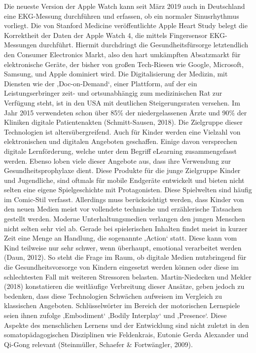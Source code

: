 \documentclass[
  a4paper,
  DIV=11,
  numbers=noendperiod,
  onecolumn,
  oneside,
  a4paper]{scrartcl}
\begin{document}
Die neueste Version der Apple Watch kann seit März 2019 auch in
Deutschland eine EKG-Messung durchführen und erfassen, ob ein normaler
Sinusrhythmus vorliegt. Die von Stanford Medicine veröffentlichte Apple
Heart Study belegt die Korrektheit der Daten der Apple Watch 4, die
mittels Fingersensor EKG-Messungen durchführt. Hiermit durchdringt die
Gesundheitsfürsorge letztendlich den Consumer Electronics Markt, also
den hart umkämpften Absatzmarkt für elektronische Geräte, der bisher von
großen Tech-Riesen wie Google, Microsoft, Samsung, und Apple dominiert
wird. Die Digitalisierung der Medizin, mit Diensten wie der
‚Doc-on-Demand`, einer Plattform, auf der ein Leistungserbringer zeit-
und ortsunabhängig zum medizinischen Rat zur Verfügung steht, ist in den
USA mit deutlichen Steigerungsraten versehen. Im Jahr 2015 verwendeten
schon über 85\% der niedergelassenen Ärzte und 90\% der Kliniken
digitale Patientenakten (Schmitt-Sausen, 2018). Die Zielgruppe dieser
Technologien ist altersübergreifend. Auch für Kinder werden eine
Vielzahl von elektronischen und digitalen Angeboten geschaffen. Einige
davon versprechen digitale Lernförderung, welche unter dem Begriff
eLearning zusammengefasst werden. Ebenso loben viele dieser Angebote
aus, dass ihre Verwendung zur Gesundheitsprophylaxe dient. Diese
Produkte für die junge Zielgruppe Kinder und Jugendliche, sind oftmals
für mobile Endgeräte entwickelt und bieten nicht selten eine eigene
Spielgeschichte mit Protagonisten. Diese Spielwelten sind häufig im
Comic-Stil verfasst. Allerdings muss berücksichtigt werden, dass Kinder
von den neuen Medien meist vor vollendete technische und erzählerische
Tatsachen gestellt werden. Moderne Unterhaltungsmedien verlangen den
jungen Menschen nicht selten sehr viel ab. Gerade bei spielerischen
Inhalten findet meist in kurzer Zeit eine Menge an Handlung, die
sogenannte ‚Action` statt. Diese kann vom Kind teilweise nur sehr
schwer, wenn überhaupt, emotional verarbeitet werden (Daun, 2012). So
steht die Frage im Raum, ob digitale Medien nutzbringend für die
Gesundheitsvorsorge von Kindern eingesetzt werden können oder diese im
schlechtesten Fall mit weiteren Stressoren belasten. Martin-Niedecken
und Mekler (2018) konstatieren die weitläufige Verbreitung dieser
Ansätze, geben jedoch zu bedenken, dass diese Technologien Schwächen
aufweisen im Vergleich zu klassischen Angeboten. Schlüsselwörter im
Bereich der motorischen Lernspiele seien ihnen zufolge ‚Embodiment`
‚Bodily Interplay` und ‚Presence`. Diese Aspekte des menschlichen
Lernens und der Entwicklung sind nicht zuletzt in den
somatopädagogischen Disziplinen wie Feldenkrais, Eutonie Gerda Alexander
und Qi-Gong relevant (Steinmüller, Schaefer \& Fortwängler, 2009).
\end{document}
